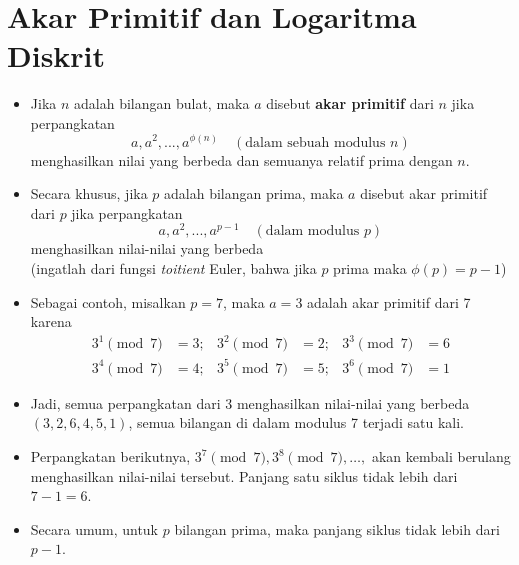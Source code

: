 \documentclass{article}
\begin{document}
\newpage


\section*{Akar Primitif dan Logaritma Diskrit}

\begin{itemize}
    \item Jika $n$ adalah bilangan bulat, maka $a$ disebut \textbf{akar primitif} dari $n$ jika perpangkatan
    \[ a, a^2, ..., a^{\phi(n)} \quad (\text{dalam sebuah modulus } n) \]
    menghasilkan nilai yang berbeda dan semuanya relatif prima dengan $n$.
    
    \item Secara khusus, jika $p$ adalah bilangan prima, maka $a$ disebut akar primitif dari $p$ jika perpangkatan
    \[ a, a^2, ..., a^{p-1} \quad (\text{dalam modulus } p) \]
    menghasilkan nilai-nilai yang berbeda \\
    (ingatlah dari fungsi \textit{toitient} Euler, bahwa jika $p$ prima maka $\phi(p) = p - 1$)
\end{itemize}

\newpage


\begin{itemize}
  \item Sebagai contoh, misalkan $p = 7$, maka $a = 3$ adalah akar primitif dari 7 karena
  \[ 
  \begin{aligned}
  3^1 \pmod 7 &= 3; & 3^2 \pmod 7 &= 2; & 3^3 \pmod 7 &= 6 \\
  3^4 \pmod 7 &= 4; & 3^5 \pmod 7 &= 5; & 3^6 \pmod 7 &= 1
  \end{aligned}
  \]
  \item Jadi, semua perpangkatan dari 3 menghasilkan nilai-nilai yang berbeda $(3, 2, 6, 4, 5, 1)$, semua bilangan di dalam modulus 7 terjadi satu kali.
  \item Perpangkatan berikutnya, $3^7 \pmod 7, 3^8 \pmod 7, \dots,$ akan kembali berulang menghasilkan nilai-nilai tersebut. Panjang satu siklus tidak lebih dari $7 - 1 = 6$.
  \item Secara umum, untuk $p$ bilangan prima, maka panjang siklus tidak lebih dari $p - 1$.
\end{itemize}

\newpage

\end{document}
